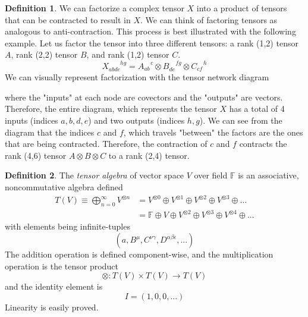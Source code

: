 \documentclass{article}
\theoremstyle{remark}
\theoremstyle{definition}
\newtheorem{definition}{Definition}[section]
\begin{document}
    \begin{definition}
    We can factorize a complex tensor $X$ into a product of tensors that can be contracted to result in $X$. We can think of factoring tensors as analogous to anti-contraction. This process is best illustrated with the following example. Let us factor the tensor into three different tensors: a rank (1,2) tensor $A$, rank (2,2) tensor $B$, and rank (1,2) tensor $C$. 
    \[X_{abde}^{\;\;\;\;\;\;\;hg} = A_{ab}^{\;\;\;\;c} \otimes B_{de}^{\;\;\;\;fg} \otimes C_{cf}^{\;\;\;\;h}\]
    We can visually represent factorization with the tensor network diagram
    \begin{center}
    \end{center}
    where the "inputs" at each node are covectors and the "outputs" are vectors. Therefore, the entire diagram, which represents the tensor $X$ has a total of 4 inputs (indices $a, b, d, e$) and two outputs (indices $h, g$). We can see from the diagram that the indices $c$ and $f$, which travels "between" the factors are the ones that are being contracted. Therefore, the contraction of $c$ and $f$ contracts the rank (4,6) tensor $A \otimes B \otimes C$ to a rank (2,4) tensor. 
    \end{definition}

    \begin{definition}
    The \textit{tensor algebra} of vector space $V$ over field $\mathbb{F}$ is an associative, noncommutative algebra defined
    \begin{align*}
        T(V) \equiv \bigoplus_{n = 0}^{\infty} V^{\otimes n} & = V^{\otimes 0} \oplus V^{\otimes 1} \oplus V^{\otimes 2} \oplus V^{\otimes 3} \oplus ... \\
        & = \mathbb{F} \oplus V \oplus V^{\otimes 2} \oplus V^{\otimes 3} \oplus V^{\otimes 4} \oplus ...
    \end{align*}
    with elements being infinite-tuples
    \[ (a, B^\mu, C^{\nu \gamma}, D^{\alpha \beta \epsilon}, ...)\]
    The addition operation is defined component-wise, and the multiplication operation is the tensor product 
    \[\otimes: T(V) \times T(V) \longrightarrow T(V)\]
    and the identity element is
    \[I = (1, 0, 0, ...) \]
    Linearity is easily proved. 
    \end{definition}
\end{document}
